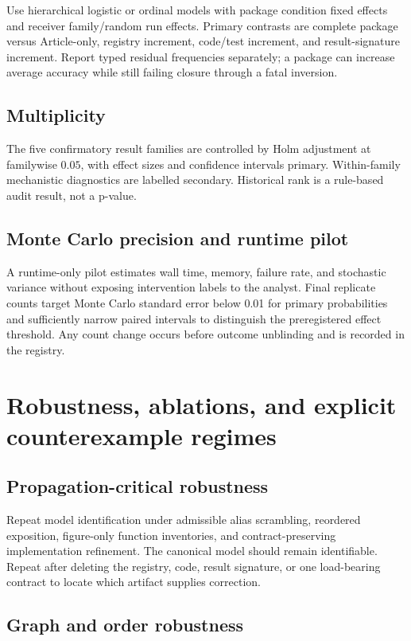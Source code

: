 \documentclass[11pt]{article}
\begin{document}
Use hierarchical logistic or ordinal models with package condition fixed effects and receiver family/random run effects. Primary contrasts are complete package versus Article-only, registry increment, code/test increment, and result-signature increment. Report typed residual frequencies separately; a package can increase average accuracy while still failing closure through a fatal inversion.

\subsection{Multiplicity}

The five confirmatory result families are controlled by Holm adjustment at familywise $0.05$, with effect sizes and confidence intervals primary. Within-family mechanistic diagnostics are labelled secondary. Historical rank is a rule-based audit result, not a p-value.

\subsection{Monte Carlo precision and runtime pilot}

A runtime-only pilot estimates wall time, memory, failure rate, and stochastic variance without exposing intervention labels to the analyst. Final replicate counts target Monte Carlo standard error below 0.01 for primary probabilities and sufficiently narrow paired intervals to distinguish the preregistered effect threshold. Any count change occurs before outcome unblinding and is recorded in the registry.

\section{Robustness, ablations, and explicit counterexample regimes}

\subsection{Propagation-critical robustness}

Repeat model identification under admissible alias scrambling, reordered exposition, figure-only function inventories, and contract-preserving implementation refinement. The canonical model should remain identifiable. Repeat after deleting the registry, code, result signature, or one load-bearing contract to locate which artifact supplies correction.

\subsection{Graph and order robustness}
\end{document}
